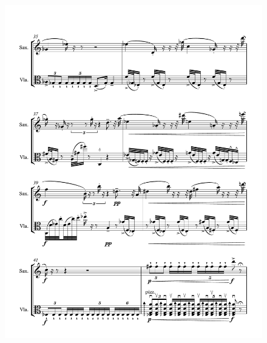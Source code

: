 \begin{figure}[htbp]
    \centering
	\includegraphics[width=6.5in]{figures/Sax_Viola_18.pdf}
\end{figure}

